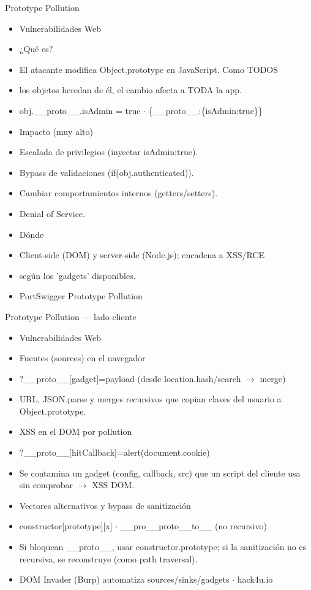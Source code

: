 \documentclass[aspectratio=169,10pt]{beamer}
\begin{document}
\begin{frame}[allowframebreaks]{Prototype Pollution}
\small
  \begin{itemize}
  \item Vulnerabilidades Web
  \item ¿Qué es?
  \item El atacante modifica Object.prototype en JavaScript. Como TODOS
  \item los objetos heredan de él, el cambio afecta a TODA la app.
  \item obj.\_\_proto\_\_.isAdmin = true $\cdot$ \{\textquotedbl{}\_\_proto\_\_\textquotedbl{}:\{\textquotedbl{}isAdmin\textquotedbl{}:true\}\}
  \item Impacto (muy alto)
  \item Escalada de privilegios (inyectar isAdmin:true).
  \item Bypass de validaciones (if(obj.authenticated)).
  \item Cambiar comportamientos internos (getters/setters).
  \item Denial of Service.
  \item Dónde
  \item Client-side (DOM) y server-side (Node.js); encadena a XSS/RCE
  \item según los 'gadgets' disponibles.
  \item PortSwigger Prototype Pollution
  \end{itemize}
\end{frame}

\begin{frame}[allowframebreaks]{Prototype Pollution --- lado cliente}
\small
  \begin{itemize}
  \item Vulnerabilidades Web
  \item Fuentes (sources) en el navegador
  \item ?\_\_proto\_\_[gadget]=payload (desde location.hash/search $\rightarrow$ merge)
  \item URL, JSON.parse y merges recursivos que copian claves del usuario a Object.prototype.
  \item XSS en el DOM por pollution
  \item ?\_\_proto\_\_[hitCallback]=alert(document.cookie)
  \item Se contamina un gadget (config, callback, src) que un script del cliente usa sin comprobar $\rightarrow$ XSS DOM.
  \item Vectores alternativos y bypass de sanitización
  \item constructor[prototype][x] $\cdot$ \_\_pro\_\_proto\_\_to\_\_ (no recursivo)
  \item Si bloquean \_\_proto\_\_, usar constructor.prototype; si la sanitización no es recursiva, se reconstruye (como path traversal).
  \item DOM Invader (Burp) automatiza sources/sinks/gadgets $\cdot$ hack4u.io
  \end{itemize}
\end{frame}
\end{document}
